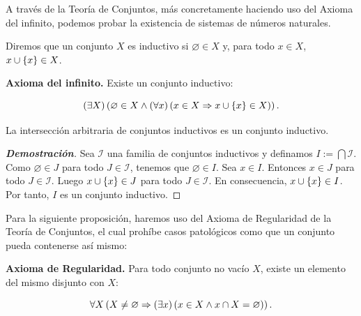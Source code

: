 A través de la Teoría de Conjuntos, más concretamente haciendo uso del Axioma del infinito, podemos probar la existencia de sistemas de números naturales. 

\begin{definition}
  \rm Diremos que un conjunto $X$ es inductivo si $\varnothing\in X$ y, para todo $x\in X$, $x\cup\left\{x\right\}\in X$.
\end{definition}

\textbf{Axioma del infinito.} Existe un conjunto inductivo:

\begin{equation}
  \left(\exists X\right)\left(\varnothing\in X\land\left(\forall x\right)\left(x\in X\Rightarrow x\cup\left\{x\right\}\in X\right)\right).
\end{equation}

\begin{proposition}
  \rm La intersección arbitraria de conjuntos inductivos es un conjunto inductivo.
  \begin{proof}[\rm\textbf{Demostración}]
    Sea $\mathcal{I}$ una familia de conjuntos inductivos y definamos $I:=\bigcap{\mathcal{I}}$. Como $\varnothing\in J$ para todo $J\in\mathcal{I}$, tenemos que $\varnothing\in I$. Sea $x\in I$. Entonces $x\in J$ para todo $J\in\mathcal{I}$. Luego $x\cup\left\{x\right\}\in J$ para todo $J\in\mathcal{I}$. En consecuencia, $x\cup\left\{x\right\}\in I$. Por tanto, $I$ es un conjunto inductivo.
  \end{proof}
\end{proposition}

Para la siguiente proposición, haremos uso del Axioma de Regularidad de la Teoría de Conjuntos, el cual prohíbe casos patológicos como que un conjunto pueda contenerse así mismo:

\textbf{Axioma de Regularidad.} Para todo conjunto no vacío $X$, existe un elemento del mismo disjunto con $X$:

\begin{equation}
  \forall X\left(X\neq\varnothing\Rightarrow\left(\exists x\right)\left(x\in X\land x\cap X=\varnothing\right)\right).
\end{equation}

